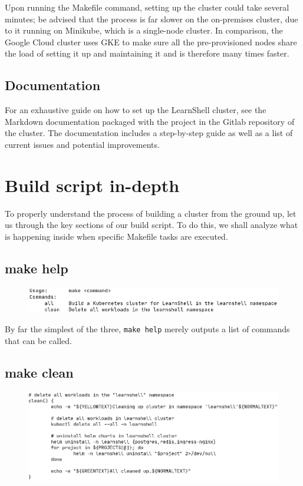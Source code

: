 \documentclass[thesis=B,english]{FITthesis}[2019/12/23]
\begin{document}
Upon running the Makefile command, setting up the cluster could take several minutes; be advised that the process is far slower on the on-premises cluster, due to it running on Minikube, which is a single-node cluster. In comparison, the Google Cloud cluster uses GKE to make sure all the pre-provisioned nodes share the load of setting it up and maintaining it and is therefore many times faster.

\subsection{Documentation}

For an exhaustive guide on how to set up the LearnShell cluster, see the Markdown documentation packaged with the project in the Gitlab repository of the cluster. The documentation includes a step-by-step guide as well as a list of current issues and potential improvements.

\section{Build script in-depth}

To properly understand the process of building a cluster from the ground up, let us through the key sections of our build script. To do this, we shall analyze what is happening inside when specific Makefile tasks are executed.

\subsection{make help}

\begin{figure}[H]
\centering
\hspace*{-0.5cm}
\includegraphics[scale=0.5]{build-help}
\end{figure}

By far the simplest of the three, \verb|make help| merely outputs a list of commands that can be called.

\subsection{make clean}

\begin{figure}[H]
\centering
\hspace*{-0.5cm}
\includegraphics[scale=0.5]{build-clean}
\end{figure}
\end{document}
